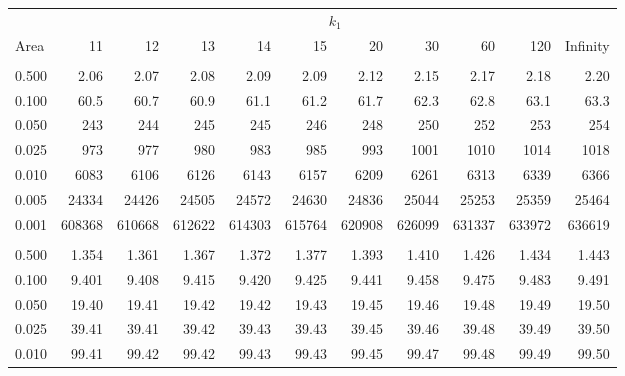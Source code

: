 \documentclass[
]{article}
\begin{document}
\begin{longtable}[t]{lrrrrrrrrrr}
\toprule
\multicolumn{1}{c}{ } & \multicolumn{10}{c}{$k_1$} \\
\cmidrule(l{3pt}r{3pt}){2-11}
Area & 11 & 12 & 13 & 14 & 15 & 20 & 30 & 60 & 120 & Infinity\\
\midrule
\addlinespace[0.3em]
\multicolumn{11}{l}{\textbf{$k_2=1$}}\\
\hspace{1em}0.500 & 2.06 & 2.07 & 2.08 & 2.09 & 2.09 & 2.12 & 2.15 & 2.17 & 2.18 & 2.20\\
\hspace{1em}0.100 & 60.5 & 60.7 & 60.9 & 61.1 & 61.2 & 61.7 & 62.3 & 62.8 & 63.1 & 63.3\\
\hspace{1em}0.050 & 243 & 244 & 245 & 245 & 246 & 248 & 250 & 252 & 253 & 254\\
\hspace{1em}0.025 & 973 & 977 & 980 & 983 & 985 & 993 & 1001 & 1010 & 1014 & 1018\\
\hspace{1em}0.010 & 6083 & 6106 & 6126 & 6143 & 6157 & 6209 & 6261 & 6313 & 6339 & 6366\\
\hspace{1em}0.005 & 24334 & 24426 & 24505 & 24572 & 24630 & 24836 & 25044 & 25253 & 25359 & 25464\\
\hspace{1em}0.001 & 608368 & 610668 & 612622 & 614303 & 615764 & 620908 & 626099 & 631337 & 633972 & 636619\\
\addlinespace[0.3em]
\multicolumn{11}{l}{\textbf{$k_2=2$}}\\
\hspace{1em}0.500 & 1.354 & 1.361 & 1.367 & 1.372 & 1.377 & 1.393 & 1.410 & 1.426 & 1.434 & 1.443\\
\hspace{1em}0.100 & 9.401 & 9.408 & 9.415 & 9.420 & 9.425 & 9.441 & 9.458 & 9.475 & 9.483 & 9.491\\
\hspace{1em}0.050 & 19.40 & 19.41 & 19.42 & 19.42 & 19.43 & 19.45 & 19.46 & 19.48 & 19.49 & 19.50\\
\hspace{1em}0.025 & 39.41 & 39.41 & 39.42 & 39.43 & 39.43 & 39.45 & 39.46 & 39.48 & 39.49 & 39.50\\
\hspace{1em}0.010 & 99.41 & 99.42 & 99.42 & 99.43 & 99.43 & 99.45 & 99.47 & 99.48 & 99.49 & 99.50\\

\end{longtable}
\end{document}
